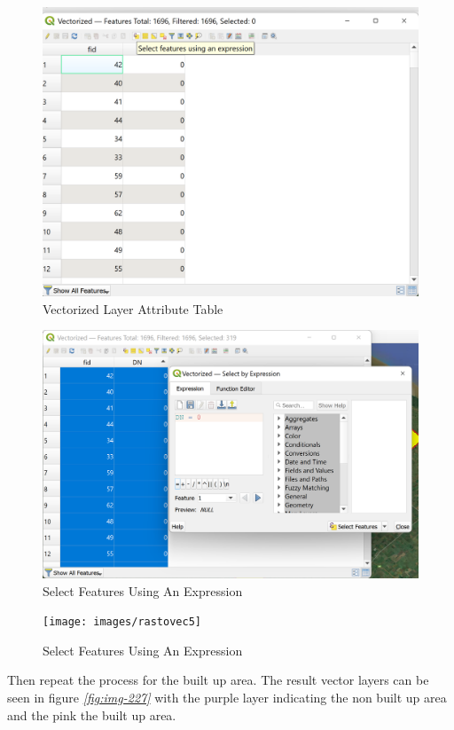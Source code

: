 \documentclass[
]{book}
\begin{document}
\begin{figure}

{\centering \includegraphics[width=0.7\linewidth]{images/rastovec3} 

}

\caption{Vectorized Layer Attribute Table}\label{fig:img-224}
\end{figure}
\begin{figure}

{\centering \includegraphics[width=0.7\linewidth]{images/rastovec4} 

}

\caption{Select Features Using An Expression}\label{fig:img-225}
\end{figure}
\begin{figure}

{\centering \texttt{[image: images/rastovec5]} 

}

\caption{Select Features Using An Expression}\label{fig:img-226}
\end{figure}

Then repeat the process for the built up area. The result vector layers can be seen in figure \emph{\ref{fig:img-227}} with the purple layer indicating the non built up area and the pink the built up area.
\end{document}
